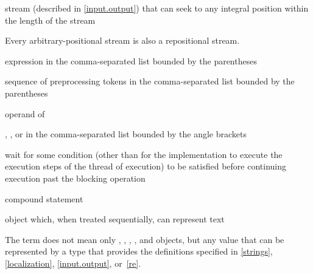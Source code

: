 %
stream (described in \ref{input.output}) that can seek to any integral position within
the length of the stream

\begin{defnote}
Every arbitrary-positional stream is also a repositional stream.
\end{defnote}

%
 expression in the
comma-separated list bounded by the parentheses

%
%
 sequence of preprocessing tokens in the
comma-separated list bounded by the parentheses

%
%
 operand of 

%
%
,
, or
 in the comma-separated
list bounded by the angle brackets

%
wait for some condition (other than for the implementation to execute
the execution steps of the thread of execution) to be satisfied before
continuing execution past the blocking operation

%
compound statement

%
object which,
when treated sequentially,
can represent text

\begin{defnote}
The term does not mean only
,
,
,
,
and
objects,
but any value that can be represented by a type
that provides the definitions specified in
\ref{strings}, \ref{localization}, \ref{input.output}, or~\ref{re}.
\end{defnote}

